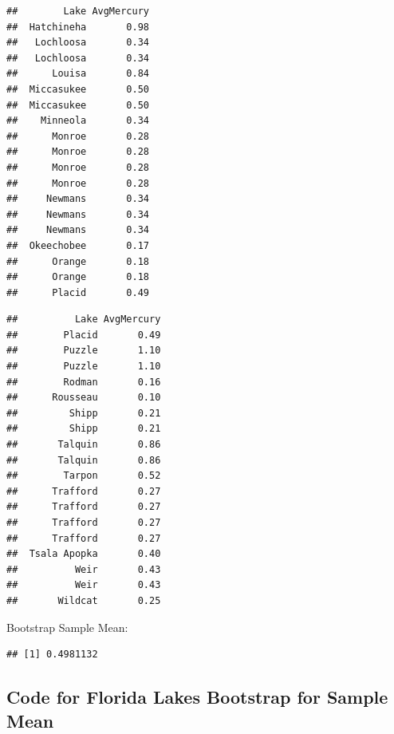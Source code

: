\documentclass[]{book}
\newenvironment{Shaded}{\begin{snugshade}}{\end{snugshade}}
\newcommand{\KeywordTok}[1]{\textcolor[rgb]{0.13,0.29,0.53}{\textbf{#1}}}
\newcommand{\DataTypeTok}[1]{\textcolor[rgb]{0.13,0.29,0.53}{#1}}
\newcommand{\DecValTok}[1]{\textcolor[rgb]{0.00,0.00,0.81}{#1}}
\newcommand{\StringTok}[1]{\textcolor[rgb]{0.31,0.60,0.02}{#1}}
\newcommand{\OtherTok}[1]{\textcolor[rgb]{0.56,0.35,0.01}{#1}}
\newcommand{\ControlFlowTok}[1]{\textcolor[rgb]{0.13,0.29,0.53}{\textbf{#1}}}
\newcommand{\OperatorTok}[1]{\textcolor[rgb]{0.81,0.36,0.00}{\textbf{#1}}}
\newcommand{\NormalTok}[1]{#1}
\begin{document}
\begin{verbatim}
##        Lake AvgMercury
##  Hatchineha       0.98
##   Lochloosa       0.34
##   Lochloosa       0.34
##      Louisa       0.84
##  Miccasukee       0.50
##  Miccasukee       0.50
##    Minneola       0.34
##      Monroe       0.28
##      Monroe       0.28
##      Monroe       0.28
##      Monroe       0.28
##     Newmans       0.34
##     Newmans       0.34
##     Newmans       0.34
##  Okeechobee       0.17
##      Orange       0.18
##      Orange       0.18
##      Placid       0.49
\end{verbatim}

\begin{verbatim}
##          Lake AvgMercury
##        Placid       0.49
##        Puzzle       1.10
##        Puzzle       1.10
##        Rodman       0.16
##      Rousseau       0.10
##         Shipp       0.21
##         Shipp       0.21
##       Talquin       0.86
##       Talquin       0.86
##        Tarpon       0.52
##      Trafford       0.27
##      Trafford       0.27
##      Trafford       0.27
##      Trafford       0.27
##  Tsala Apopka       0.40
##          Weir       0.43
##          Weir       0.43
##       Wildcat       0.25
\end{verbatim}

Bootstrap Sample Mean:

\begin{Shaded}
\end{Shaded}

\begin{verbatim}
## [1] 0.4981132
\end{verbatim}

\subsection{Code for Florida Lakes Bootstrap for Sample
Mean}\label{code-for-florida-lakes-bootstrap-for-sample-mean}

\begin{Shaded}
\end{Shaded}
\end{document}
